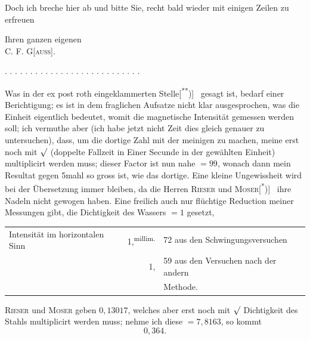 Doch ich breche hier ab und bitte Sie, recht bald wieder mit einigen
Zeilen zu erfreuen
\begin{flushright}
Ihren ganzen eigenen\hspace{2em}\\[.5ex]
C. F. G[\textsc{auss}].
\end{flushright}
\noindent . . . . . . . . . . . . . . . . . . . . . . . . . . .\par
\indent Was in der ex post roth eingeklammerten Stelle[\textsuperscript{**})]\begingroup\renewcommand{\thefootnote}{}
\endgroup\ gesagt ist, bedarf
 einer Berichtigung; es ist in dem fraglichen Aufsatze nicht klar
ausgesprochen, was die Einheit eigentlich bedeutet, womit die magnetische
Intensität gemessen werden soll; ich vermuthe aber (ich habe jetzt nicht Zeit
dies gleich genauer zu untersuchen), dass, um die dortige Zahl mit der meinigen
 zu machen, meine erst noch mit \(\surd\) (doppelte Fallzeit
\clearpage{}
\noindent in Einer Secunde in der gewählten Einheit) multiplicirt werden muss; dieser
Factor ist nun nahe \(=99\), wonach dann mein Resultat gegen 5mahl so gross
ist, wie das dortige. Eine kleine Ungewissheit wird bei der Übersetzung immer
bleiben, da die Herren \textsc{Rieser} und \textsc{Moser}[\textsuperscript{*})]\begingroup\renewcommand{\thefootnote}{}
\endgroup\ ihre Nadeln nicht gewogen haben.
Eine freilich auch nur flüchtige Reduction meiner Messungen gibt, die Dichtigkeit
des Wassers \(=1\) gesetzt,
\begin{center}
\begin{tabular}{@{}l@{\quad}r@{\,}l@{}}
Intensität im horizontalen Sinn & 1,\textsuperscript{millim.}&72 aus den Schwingungsversuchen\\
&1,&59 aus den Versuchen nach der andern\\
&&\quad Methode.
\end{tabular}
\end{center}
\noindent\hspace*{\parindent}\textsc{Rieser} und \textsc{Moser} geben \(0{,}13017\), welches aber erst noch mit \(\surd\) Dichtigkeit
des Stahls multiplicirt werden muss; nehme ich diese \(=7{,}8163\), so kommt
\[
0{,}364.
\]
\clearpage\endgroup
